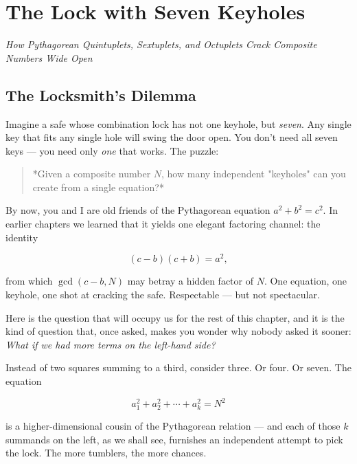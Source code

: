 \chapter{The Lock with Seven Keyholes}



\begin{center}\textit{How Pythagorean Quintuplets, Sextuplets, and Octuplets Crack Composite Numbers Wide Open}\end{center}
\bigskip


\ornbreak



\section{The Locksmith's Dilemma}


Imagine a safe whose combination lock has not one keyhole, but \textit{seven}. Any single key that fits any single hole will swing the door open. You don't need all seven keys --- you need only \textit{one} that works. The puzzle:

\begin{quote}
*Given a composite number $N$, how many independent "keyholes" can you create from a single equation?*
\end{quote}

By now, you and I are old friends of the Pythagorean equation $a^2 + b^2 = c^2$. In earlier chapters we learned that it yields one elegant factoring channel: the identity

\[
(c - b)(c + b) = a^2,
\]

from which $\gcd(c - b, N)$ may betray a hidden factor of $N$. One equation, one keyhole, one shot at cracking the safe. Respectable --- but not spectacular.

Here is the question that will occupy us for the rest of this chapter, and it is the kind of question that, once asked, makes you wonder why nobody asked it sooner: \textit{What if we had more terms on the left-hand side?}

Instead of two squares summing to a third, consider three. Or four. Or seven. The equation

\[
a_1^2 + a_2^2 + \cdots + a_k^2 = N^2
\]

is a higher-dimensional cousin of the Pythagorean relation --- and each of those $k$ summands on the left, as we shall see, furnishes an independent attempt to pick the lock. The more tumblers, the more chances.

